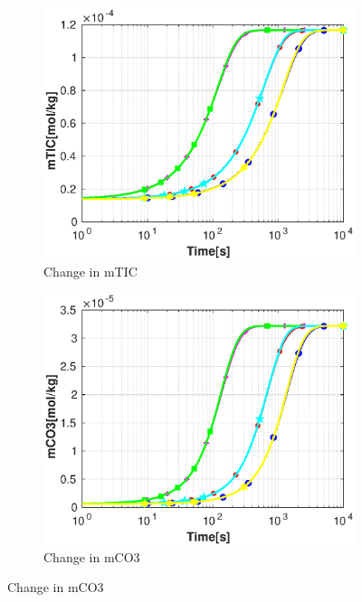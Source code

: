 \begin{figure}
    \hfill
    \begin{subfigure}{.5\linewidth}
            \centering
        \includegraphics[width=\textwidth]{PICTURES/dvm_pH9_mTIC.eps}
        \caption{Change in mTIC}
        \label{fig:dvmpH9mTIC}
    \end{subfigure}%
    \hfill
    \begin{subfigure}{.5\linewidth}
            \centering
        \includegraphics[width=\textwidth]{PICTURES/dvm_pH9_mCO3.eps}
        \caption{Change in mCO3}
        \label{fig:dvmpH9mCO3}
    \end{subfigure}%

\end{figure}

